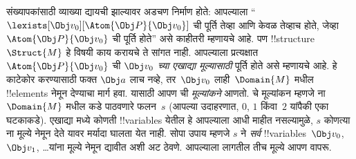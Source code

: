 \documentclass[../../../include/open-logic-section]{subfiles}
\begin{document}
संख्यापकांसाठी व्याख्या द्यायची झाल्यावर अडचण निर्माण होते: आपल्याला
``$\lexists[\Obj v_0][\Atom{\Obj P}{\Obj v_0}]$ ची पूर्ति तेव्हा आणि
केवळ तेव्हाच होते, जेव्हा $\Atom{\Obj P}{\Obj v_0}$ ची पूर्ति होते''
असे काहीतरी म्हणायचे आहे. पण !!{structure}~$\Struct{M}$ हे
विषयी काय करायचे ते सांगत नाही. आपल्याला प्रत्यक्षात
$\Atom{\Obj P}{\Obj v_0}$ ची \emph{$\Obj v_0$ च्या एखाद्या मूल्यासाठी}
पूर्ति होते असे म्हणायचे आहे. हे काटेकोर करण्यासाठी फक्त $\Obj a$ लाच
नव्हे, तर~$\Obj v_0$ लाही~$\Domain{M}$ मधील !!{element}s नेमून देण्याचा
मार्ग हवा. यासाठी आपण ची \emph{मूल्यांकने} आणतो.
चे मूल्यांकन म्हणजे ना~$\Domain{M}$ मधील
कडे पाठवणारे फलन~$s$ (आपल्या उदाहरणात, $0$, $1$ किंवा~$2$
यांपैकी एका घटकाकडे). एखाद्या मध्ये कोणती !!{variable}s
येतील हे आपल्याला आधी माहीत नसल्यामुळे, $s$ कोणत्या ना
मूल्ये नेमून देते यावर मर्यादा घालता येत नाही. सोपा उपाय म्हणजे $s$ ने
\emph{सर्व} !!{variable}s~$\Obj v_0$, $\Obj v_1$, \dots\@ यांना मूल्ये
नेमून द्यावीत अशी अट ठेवणे. आपल्याला लागतील तीच मूल्ये आपण वापरू.
\end{document}
